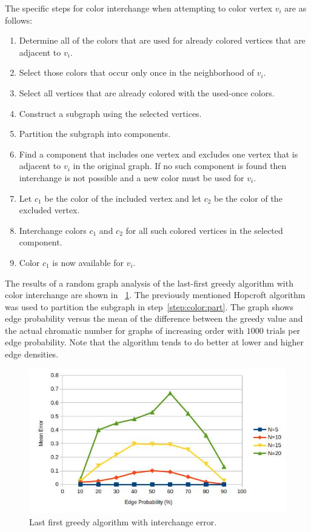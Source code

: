 The specific steps for color interchange when attempting to color vertex \(v_i\) are as follows:
\begin{enumerate}
\item Determine all of the colors that are used for already colored vertices that are adjacent to \(v_i\).
\item Select those colors that occur only once in the neighborhood of \(v_i\).
\item Select all vertices that are already colored with the used-once colors.
\item Construct a subgraph using the selected vertices.
\item\label{step:color:part} Partition the subgraph into components.
\item Find a component that includes one vertex and excludes one vertex that is adjacent to \(v_i\) in the original
  graph.  If no such component is found then interchange is not possible and a new color must be used for \(v_i\).
\item Let \(c_1\) be the color of the included vertex and let \(c_2\) be the color of the excluded vertex.
\item Interchange colors \(c_1\) and \(c_2\) for all such colored vertices in the selected component.
\item Color \(c_1\) is now available for \(v_i\).
\end{enumerate}

The results of a random graph analysis of the last-first greedy algorithm with color interchange are shown in
\figurename~\ref{fig:greedyerr}.  The previously mentioned Hopcroft algorithm~\cite{hopcroft} was used to partition
the subgraph in step~\ref{step:color:part}.  The graph shows edge probability versus the mean of the difference
between the greedy value and the actual chromatic number for graphs of increasing order with \(1000\) trials per
edge probability.  Note that the algorithm tends to do better at lower and higher edge densities.

\begin{figure}[H]
  \centering
  \includegraphics[width=5in]{greedy_error}
  \caption{Last first greedy algorithm with interchange error.}
  \label{fig:greedyerr}
\end{figure}

